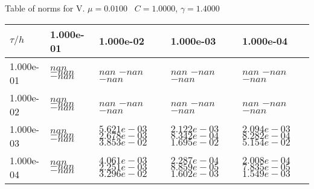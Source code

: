 \begin{center}
Table of norms for V. $\mu = 0.0100$ \, $C = 1.0000$, $\gamma = 1.4000$
  
\begin{tabular}{|p{1in}|p{1in}|p{1in}|p{1in}|p{1in}|} \hline
$\tau / h$ &1.000e-01 &1.000e-02 &1.000e-03 &1.000e-04 \\ \hline 
1.000e-01 & $nan$  $-nan$  $-nan$  & $nan$  $-nan$  $-nan$  & $nan$  $-nan$  $-nan$  & $nan$  $-nan$  $-nan$  \\ \hline 
1.000e-02 & $nan$  $-nan$  $-nan$  & $nan$  $-nan$  $-nan$  & $nan$  $-nan$  $-nan$  & $nan$  $-nan$  $-nan$  \\ \hline 
1.000e-03 & $nan$  $-nan$  $-nan$  & $5.621e-03$  $2.678e-03$  $3.853e-02$  & $2.122e-03$  $8.342e-04$  $1.695e-02$  & $2.094e-03$  $8.282e-04$  $5.154e-02$  \\ \hline 
1.000e-04 & $nan$  $-nan$  $-nan$  & $4.061e-03$  $2.251e-03$  $3.296e-02$  & $2.287e-04$  $8.859e-05$  $1.602e-03$  & $2.008e-04$  $7.835e-05$  $1.549e-03$  \\ \hline 

\end{tabular}\\[20pt]
\end{center}

